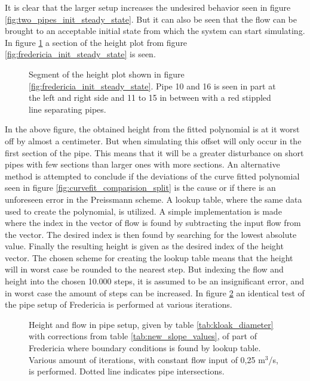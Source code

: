 It is clear that the larger setup increases the undesired behavior seen in figure \ref{fig:two_pipes_init_steady_state}. But it can also be seen that the flow can be brought to an acceptable initial state from which the system can start simulating. In figure \ref{fig:fredericia_init_steady_state_zoom} a section of the height plot from figure \ref{fig:fredericia_init_steady_state} is seen. 

\begin{figure}[H]
 \centering
 
\caption{Segment of the height plot shown in figure \ref{fig:fredericia_init_steady_state}. Pipe 10 and 16 is seen in part at the left and right side and 11 to 15 in between with a red stippled line separating pipes.}
\label{fig:fredericia_init_steady_state_zoom}
\end{figure}

In the above figure, the obtained height from the fitted polynomial is at it worst off by almost a centimeter. But when simulating this offset will only occur in the first section of the pipe. This means that it will be a greater disturbance on short pipes with few sections than larger ones with more sections. An alternative method is attempted to conclude if the deviations of the curve fitted polynomial seen in figure \ref{fig:curvefit_comparision_split} is the cause or if there is an unforeseen error in the Preissmann scheme. A lookup table, where the same data used to create the polynomial, is utilized. A simple implementation is made where the index in the vector of flow is found by subtracting the input flow from the vector. The desired index is then found by searching for the lowest absolute value. Finally the resulting height is given as the desired index of the height vector. The chosen scheme for creating the lookup table means that the height will in worst case be rounded to the nearest step. But indexing the flow and height into the chosen 10.000 steps, it is assumed to be an insignificant error, and in worst case the amount of steps can be increased. In figure \ref{fig:fredericia_init_steady_state_lut} an identical test of the pipe setup of Fredericia is performed at various iterations.      

\begin{figure}[H]
 \centering
 
\caption{Height and flow in pipe setup, given by table \ref{tab:kloak_diameter} with corrections from table \ref{tab:new_slope_values}, of part of Fredericia where boundary conditions is found by lookup table. Various amount of iterations, with constant flow input of 0,25 $\text{m}^\text{3}$/s, is performed. Dotted line indicates pipe intersections.}
\label{fig:fredericia_init_steady_state_lut}
\end{figure}


